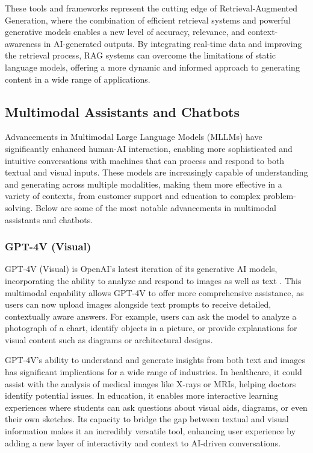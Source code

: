 These tools and frameworks represent the cutting edge of Retrieval-Augmented Generation, where the combination of efficient retrieval systems and powerful generative models enables a new level of accuracy, relevance, and context-awareness in AI-generated outputs. 
By integrating real-time data and improving the retrieval process, RAG systems can overcome the limitations of static language models, offering a more dynamic and informed approach to generating content in a wide range of applications.

\subsection{Multimodal Assistants and Chatbots}

Advancements in Multimodal Large Language Models (MLLMs) have significantly enhanced human-AI interaction, enabling more sophisticated and intuitive conversations with machines that can process and respond to both textual and visual inputs. 
These models are increasingly capable of understanding and generating across multiple modalities, making them more effective in a variety of contexts, from customer support and education to complex problem-solving. 
Below are some of the most notable advancements in multimodal assistants and chatbots.

\subsubsection{GPT-4V (Visual)}

GPT-4V (Visual) is OpenAI's latest iteration of its generative AI models, incorporating the ability to analyze and respond to images as well as text \cite{openai2023gpt4}. 
This multimodal capability allows GPT-4V to offer more comprehensive assistance, as users can now upload images alongside text prompts to receive detailed, contextually aware answers. 
For example, users can ask the model to analyze a photograph of a chart, identify objects in a picture, or provide explanations for visual content such as diagrams or architectural designs.

GPT-4V's ability to understand and generate insights from both text and images has significant implications for a wide range of industries. 
In healthcare, it could assist with the analysis of medical images like X-rays or MRIs, helping doctors identify potential issues. 
In education, it enables more interactive learning experiences where students can ask questions about visual aids, diagrams, or even their own sketches. 
Its capacity to bridge the gap between textual and visual information makes it an incredibly versatile tool, enhancing user experience by adding a new layer of interactivity and context to AI-driven conversations.

